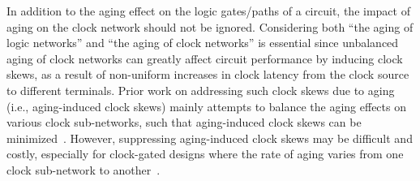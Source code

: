 In addition to the aging effect on the logic gates/paths of a circuit, the impact of aging on the clock network should not be ignored. Considering both \enquote{the aging of logic networks} and \enquote{the aging of clock networks} is essential since unbalanced aging of clock networks can greatly affect circuit performance by inducing clock skews, as a result of non-uniform increases in clock latency from the clock source to different terminals. Prior work on addressing such clock skews due to aging (i.e., aging-induced clock skews) mainly attempts to balance the aging effects on various clock sub-networks, such that aging-induced clock skews can be minimized~\cite{chen2013novel, huang2013low, chakraborty2013skew}. However, suppressing aging-induced clock skews may be difficult and costly, especially for clock-gated designs where the rate of aging varies from one clock sub-network to another~\cite{lai2014bti}.

